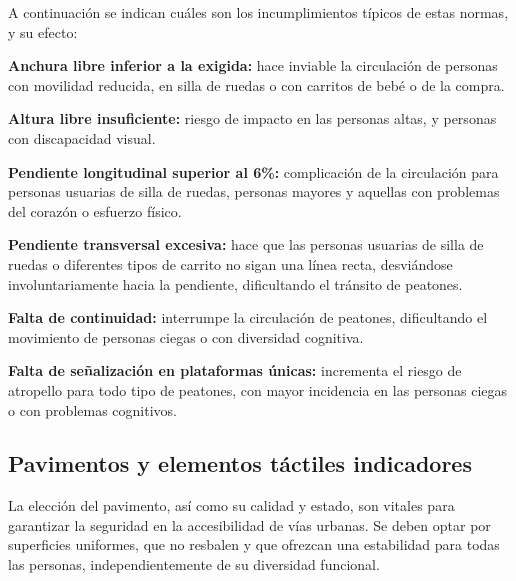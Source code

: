 A continuación se indican cuáles son los incumplimientos típicos de estas normas, y su efecto:
\begin{inconvenientes}
  \item \textbf{Anchura libre inferior a la exigida:} hace inviable la circulación de personas con movilidad reducida, en silla de ruedas o con carritos de bebé o de la compra.
  \item \textbf{Altura libre insuficiente:} riesgo de impacto en las personas altas, y personas con discapacidad visual.
  \item \textbf{Pendiente longitudinal superior al 6\%:} complicación de la circulación para personas usuarias de silla de ruedas, personas mayores y aquellas con problemas del corazón o esfuerzo físico.
  \item \textbf{Pendiente transversal excesiva:} hace que las personas usuarias de silla de ruedas o diferentes tipos de carrito no sigan una línea recta, desviándose involuntariamente hacia la pendiente, dificultando el tránsito de peatones.
  \item \textbf{Falta de continuidad:} interrumpe la circulación de peatones, dificultando el movimiento de personas ciegas o con diversidad cognitiva.
  \item \textbf{Falta de señalización en plataformas únicas:} incrementa el riesgo de atropello para todo tipo de peatones, con mayor incidencia en las personas ciegas o con problemas cognitivos.
\end{inconvenientes}

        {}

\parametroclave{\porrellenar}

\subsection{Pavimentos y elementos táctiles indicadores}
\label{subsec:pavimentos}

La elección del pavimento, así como su calidad y estado, son vitales para garantizar la seguridad en la accesibilidad de vías urbanas. Se deben optar por superficies uniformes, que no resbalen y que ofrezcan una estabilidad para todas las personas, independientemente de su diversidad funcional.
\\

